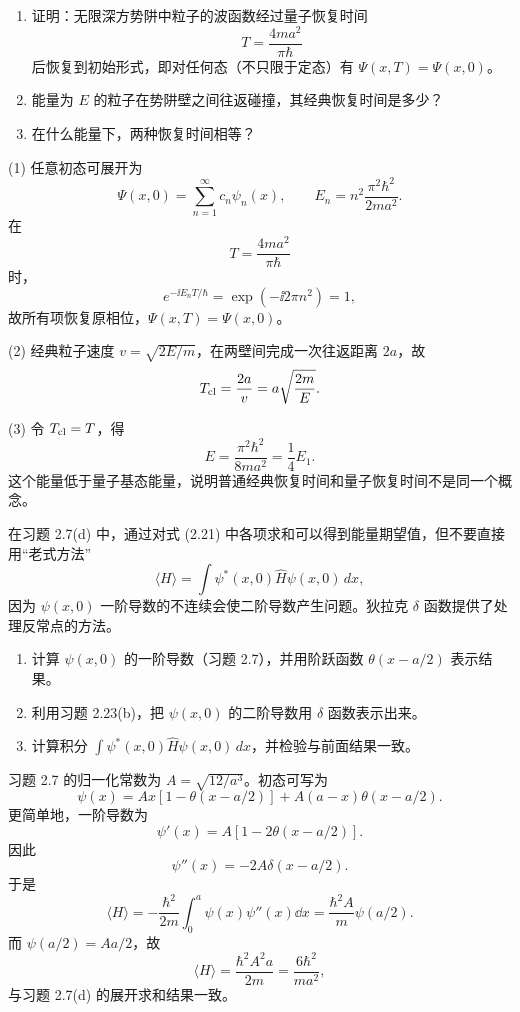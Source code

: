 \begin{question}
\begin{enumerate}
\item 证明：无限深方势阱中粒子的波函数经过量子恢复时间
\[
T=\frac{4ma^2}{\pi\hbar}
\]
后恢复到初始形式，即对任何态（不只限于定态）有 $\Psi(x,T)=\Psi(x,0)$。
\item 能量为 $E$ 的粒子在势阱壁之间往返碰撞，其经典恢复时间是多少？
\item 在什么能量下，两种恢复时间相等？
\end{enumerate}
\end{question}
\begin{solution}
(1) 任意初态可展开为
\[
\Psi(x,0)=\sum_{n=1}^{\infty}c_n\psi_n(x),
\qquad
E_n=n^2\frac{\pi^2\hbar^2}{2ma^2}.
\]
在
\[
T=\frac{4ma^2}{\pi\hbar}
\]
时，
\[
e^{-\ii E_nT/\hbar}=\exp(-\ii 2\pi n^2)=1,
\]
故所有项恢复原相位，$\Psi(x,T)=\Psi(x,0)$。

(2) 经典粒子速度 $v=\sqrt{2E/m}$，在两壁间完成一次往返距离 $2a$，故
\[
T_{\rm cl}=\frac{2a}{v}=a\sqrt{\frac{2m}{E}}.
\]

(3) 令 $T_{\rm cl}=T$，得
\[
E=\frac{\pi^2\hbar^2}{8ma^2}=\frac14E_1.
\]
这个能量低于量子基态能量，说明普通经典恢复时间和量子恢复时间不是同一个概念。
\end{solution}

\begin{question}
在习题 2.7(d) 中，通过对式 (2.21) 中各项求和可以得到能量期望值，但不要直接用“老式方法”
\[
\langle H\rangle=\int \psi^*(x,0)\hat H\psi(x,0)\,dx,
\]
因为 $\psi(x,0)$ 一阶导数的不连续会使二阶导数产生问题。狄拉克 $\delta$ 函数提供了处理反常点的方法。
\begin{enumerate}
\item 计算 $\psi(x,0)$ 的一阶导数（习题 2.7），并用阶跃函数 $\theta(x-a/2)$ 表示结果。
\item 利用习题 2.23(b)，把 $\psi(x,0)$ 的二阶导数用 $\delta$ 函数表示出来。
\item 计算积分 $\int\psi^*(x,0)\hat H\psi(x,0)\,dx$，并检验与前面结果一致。
\end{enumerate}

\par\smallskip
{}

\end{question}
\begin{solution}
习题 2.7 的归一化常数为 $A=\sqrt{12/a^3}$。初态可写为
\[
\psi(x)=Ax[1-\theta(x-a/2)]+A(a-x)\theta(x-a/2).
\]
更简单地，一阶导数为
\[
\psi'(x)=A\left[1-2\theta(x-a/2)\right].
\]
因此
\[
\psi''(x)=-2A\delta(x-a/2).
\]
于是
\[
\langle H\rangle=-\frac{\hbar^2}{2m}\int_0^a\psi(x)\psi''(x)\dd x
=\frac{\hbar^2A}{m}\psi(a/2).
\]
而 $\psi(a/2)=Aa/2$，故
\[
\langle H\rangle=\frac{\hbar^2A^2a}{2m}
=\frac{6\hbar^2}{ma^2},
\]
与习题 2.7(d) 的展开求和结果一致。
\end{solution}

